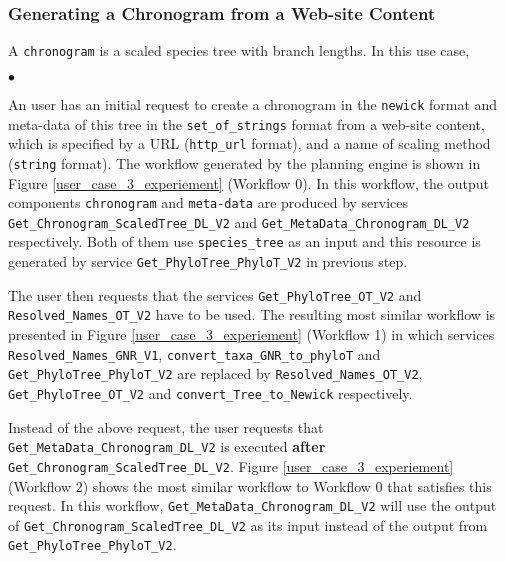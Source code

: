 \documentclass{new_tlp}
\begin{document}
\subsubsection{Generating a Chronogram from a Web-site Content}

A \texttt{\small chronogram} is a scaled species tree with branch lengths. In this use case, 

\begin{list}{$\bullet$}{\itemsep=0pt \parsep=1pt \topsep=1pt} 

\item An user has an initial request to create a chronogram in the \texttt{\small newick} format and meta-data of this tree in the \texttt{\small set\_of\_strings} format from a web-site content, which is specified by a URL (\texttt{\small http\_url} format), and a name of scaling method (\texttt{\small string} format). The workflow  generated by the planning engine is shown in Figure \ref{user_case_3_experiement} (Workflow 0).
In this workflow, the output components \texttt{\small chronogram} and \texttt{\small meta-data} are produced by services \texttt{\small Get\_Chronogram\_ScaledTree\_DL\_V2} and \texttt{\small Get\_MetaData\_Chronogram\_DL\_V2} respectively. Both of them use \texttt{\small species\_tree} as an input and this resource is generated by service \texttt{\small Get\_PhyloTree\_PhyloT\_V2} in previous step. 

\item The user then requests that the services \texttt{\small Get\_PhyloTree\_OT\_V2} and \texttt{\small Resolved\_Names\_OT\_V2} have to be used.  
The resulting most similar workflow is presented in Figure \ref{user_case_3_experiement} (Workflow 1) in which services \texttt{\small Resolved\_Names\_GNR\_V1}, \texttt{\small convert\_taxa\_GNR\_to\_phyloT} and \texttt{\small Get\_PhyloTree\_PhyloT\_V2} are replaced by \texttt{\small Resolved\_Names\_OT\_V2}, \texttt{\small Get\_PhyloTree\_OT\_V2} and \texttt{\small convert\_Tree\_to\_Newick} respectively. 

\item Instead of the above request, the user requests that \texttt{\small Get\_MetaData\_Chronogram\_DL\_V2} is executed \textbf{after}   \texttt{\small Get\_Chronogram\_ScaledTree\_DL\_V2}. 
Figure \ref{user_case_3_experiement} (Workflow 2) shows the most similar workflow to Workflow 0 that satisfies this request. 
In this workflow,  \texttt{\small Get\_MetaData\_Chronogram\_DL\_V2} will use the output of 
\texttt{\small Get\_Chronogram\_ScaledTree\_DL\_V2} as its input instead of the output from  \texttt{\small Get\_PhyloTree\_PhyloT\_V2}.


\end{list}
\end{document}
